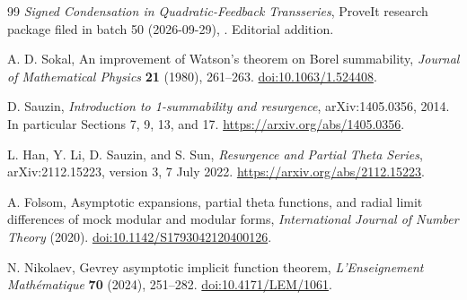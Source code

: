 \documentclass[11pt,a4paper]{article}
\numberwithin{equation}{section}
\theoremstyle{definition}\newtheorem{definition}[theorem]{Definition}
\theoremstyle{remark}\newtheorem{remark}[theorem]{Remark}
\theoremstyle{definition}
\begin{document}
\begin{thebibliography}{99}
\emph{Signed Condensation in Quadratic-Feedback Transseries}, ProveIt research
package filed in batch 50 (2026-09-29),
.
Editorial addition.

A. D. Sokal, An improvement of Watson's theorem on Borel summability,
\emph{Journal of Mathematical Physics} \textbf{21} (1980), 261--263.
\href{https://doi.org/10.1063/1.524408}{doi:10.1063/1.524408}.

D. Sauzin, \emph{Introduction to 1-summability and resurgence},
arXiv:1405.0356, 2014. In particular Sections 7, 9, 13, and 17.
\url{https://arxiv.org/abs/1405.0356}.

L. Han, Y. Li, D. Sauzin, and S. Sun,
\emph{Resurgence and Partial Theta Series},
arXiv:2112.15223, version 3, 7 July 2022.
\url{https://arxiv.org/abs/2112.15223}.

A. Folsom, Asymptotic expansions, partial theta functions, and radial limit
differences of mock modular and modular forms,
\emph{International Journal of Number Theory} (2020).
\href{https://doi.org/10.1142/S1793042120400126}{doi:10.1142/S1793042120400126}.

N. Nikolaev, Gevrey asymptotic implicit function theorem,
\emph{L'Enseignement Math\'ematique} \textbf{70} (2024), 251--282.
\href{https://doi.org/10.4171/LEM/1061}{doi:10.4171/LEM/1061}.
\end{thebibliography}
\end{document}
